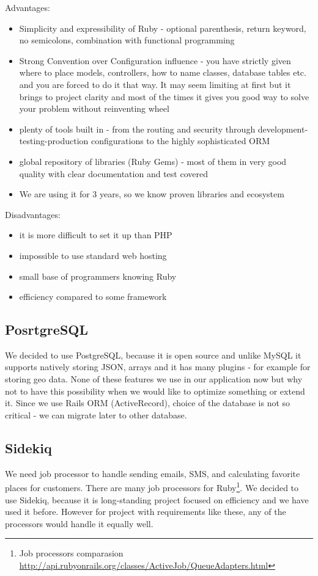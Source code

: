 Advantages:
\begin{itemize}
	\item Simplicity and expressibility of Ruby - optional parenthesis, return keyword, no semicolons, combination with functional programming 
	\item Strong Convention over Configuration influence - you have strictly given where to place models, controllers, how to name classes, database tables etc. and you are forced to do it that way. It may seem limiting at first but it brings to project clarity and most of the times it gives you good way to solve your problem without reinventing wheel
	\item plenty of tools built in - from the routing and security through development-testing-production configurations to the highly sophisticated ORM
	\item global repository of libraries (Ruby Gems) - most of them in very good quality with clear documentation and test covered
	\item We are using it for 3 years, so we know proven libraries and ecosystem
\end{itemize} 
Disadvantages:
\begin{itemize}
	\item it is more difficult to set it up than PHP
	\item impossible to use standard web hosting
	\item small base of programmers knowing Ruby
	\item efficiency compared to some framework 
\end{itemize}
  
\subsection{PosrtgreSQL}
We decided to use PostgreSQL, because it is open source and unlike MySQL it supports natively storing JSON, arrays and it has many plugins - for example for storing geo data. None of these features we use in our application now but why not to have this possibility when we would like to optimize something or extend it. Since we use Rails ORM (ActiveRecord), choice of the database is not so critical - we can migrate later to other database.
\subsection{Sidekiq}
We need job processor to handle sending emails, SMS, and calculating favorite places for customers. 
There are many job processors for Ruby\footnote{ Job processors comparasion \url{http://api.rubyonrails.org/classes/ActiveJob/QueueAdapters.html}}. We decided to use Sidekiq, because it is long-standing project focused on efficiency and we have used it before. However for project with requirements like these, any of the processors would handle it equally well. 
